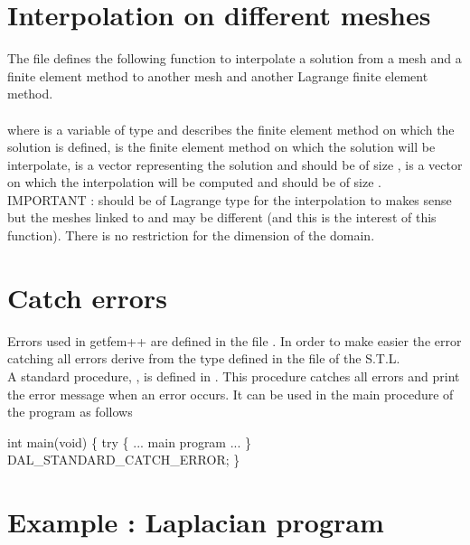 \documentclass[11pt,a4paper]{article}
\begin{document}
\section{Interpolation on different meshes}

The file  defines the following function to interpolate a solution from a mesh and a finite element method  to another mesh and another Lagrange finite element method.\\[0.5cm]
\\[0.5cm]
where   is a variable of type  and describes the finite element method on which the solution is defined,  is the finite element method on which the solution will be interpolate,   is a vector representing the solution and should be of size ,  is a vector on which the interpolation will be computed and should be of size . IMPORTANT :  should be of Lagrange type for the interpolation to makes sense but the meshes linked to  and  may be different (and this is the interest of this function). There is no restriction for the dimension of the domain. 
 
\section{Catch errors}

Errors used in getfem++ are defined in the file . In order to make easier  the error catching all errors derive from the type  defined in the file  of the S.T.L.\\[0.5cm]
A standard procedure, , is defined in . This procedure catches all errors and print the error message when an error occurs. It can be used in the main procedure of the program as follows\\[0.5cm]
\begin{cppcode}
  int main(void) \{ 
    try \{ 
      ... main program ... 
        \} 
     DAL\_STANDARD\_CATCH\_ERROR;
  \}
\end{cppcode}

\section{Example : Laplacian program}
\end{document}
